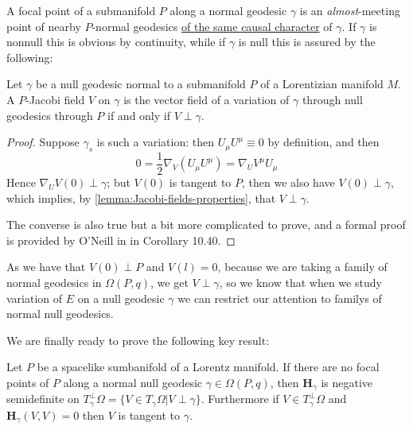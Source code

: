 A focal point of a submanifold \(P\) along a normal geodesic \(\gamma\) is an \emph{almost}-meeting point of nearby \(P\)-normal geodesics \underline{of the same causal character} of \(\gamma\). If \(\gamma\) is nonnull this is obvious by continuity, while if \(\gamma\) is null this is assured by the following:
\begin{corollary}
	Let \(\gamma\) be a null geodesic normal to a submanifold \(P\) of a Lorentizian manifold \(M\). A \(P\)-Jacobi field \(V\) on \(\gamma\) is the vector field of a variation of \(\gamma\) through null geodesics through \(P\) if and only if \(V \perp \gamma\).
\end{corollary}

\begin{proof}
	Suppose \(\gamma_s\) is such a variation: then \(U_{\mu}U^{\mu}\equiv 0\) by definition, and then
	\[
	0 = \frac{1}{2}\nabla_V(U_{\mu}U^{\mu}) = \nabla_UV^{\mu}U_{\mu}
	\]
	Hence \(\nabla_UV(0) \perp \gamma\); but \(V(0)\) is tangent to \(P\), then we also have \(V(0) \perp \gamma\), which implies, by \ref{lemma:Jacobi-fields-properties}, that \(V \perp \gamma\).
	
	The converse is also true but a bit more complicated to prove, and a formal proof is provided by O'Neill in \cite{o1983semi} in Corollary 10.40.
\end{proof}

As we have that \(V(0) \perp P\) and \(V(l) = 0\), because we are taking a family of normal geodesics in \(\Omega(P, q)\), we get \(V \perp \gamma\), so we know that when we study variation of \(E\) on a null geodesic \(\gamma\) we can restrict our attention to familys of normal null geodesics.

We are finally ready to prove the following key result:
\begin{prop}
	\label{prop:H-positivity-criteria}
	Let \(P\) be a spacelike sumbanifold of a Lorentz manifold. If there are no focal points of \(P\) along a normal null geodesic \(\gamma\in\Omega(P,q)\), then \(\textbf{H}_\gamma\) is negative semidefinite on \(T_{\gamma}^{\perp}\Omega = \{V \in T_{\gamma}\Omega \vert V \perp \gamma\}\). Furthermore if \(V \in T_{\gamma}^{\perp}\Omega \) and \(\textbf{H}_\gamma(V, V) = 0\) then \(V\) is tangent to \(\gamma\).
\end{prop}

